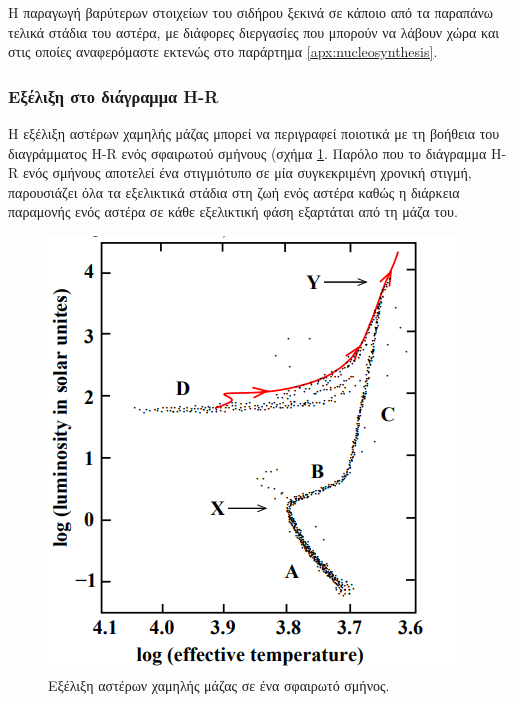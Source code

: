  Η παραγωγή βαρύτερων στοιχείων του σιδήρου ξεκινά σε κάποιο από τα παραπάνω τελικά στάδια του αστέρα, με διάφορες διεργασίες που μπορούν να λάβουν χώρα και στις οποίες αναφερόμαστε εκτενώς στο παράρτημα \ref{apx:nucleosynthesis}.
\subsubsection{Εξέλιξη στο διάγραμμα H-R}
Η εξέλιξη αστέρων χαμηλής μάζας μπορεί να περιγραφεί ποιοτικά με τη βοήθεια του διαγράμματος H-R ενός σφαιρωτού σμήνους (σχήμα \ref{fig:hrd_evolution}. Παρόλο που το διάγραμμα H-R ενός σμήνους αποτελεί ένα στιγμιότυπο σε μία συγκεκριμένη χρονική στιγμή, παρουσιάζει όλα τα εξελικτικά στάδια στη ζωή ενός αστέρα καθώς η διάρκεια παραμονής ενός αστέρα σε κάθε εξελικτική φάση εξαρτάται από τη μάζα του.

\begin{figure}
    \centering
    \includegraphics[scale=0.6]{Figures/hrd_evolution.png}
    \caption{Εξέλιξη αστέρων χαμηλής μάζας σε ένα σφαιρωτό σμήνος.}
    \label{fig:hrd_evolution}
\end{figure}

